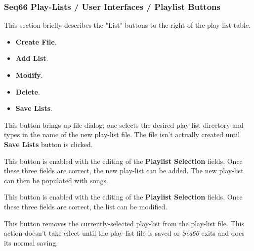 \subsubsection{Seq66 Play-Lists / User Interfaces / Playlist Buttons}
\label{subsubsec:playlist_ui_playlist_buttons}

   This section briefly describes the "List" buttons to the right of the
   play-list table.

   \begin{itemize}
      \item \textbf{Create File}.
      \item \textbf{Add List}.
      \item \textbf{Modify}.
      \item \textbf{Delete}.
      \item \textbf{Save Lists}.
   \end{itemize}

   \setcounter{ItemCounter}{0}      %


   This button brings up file dialog; one selects the desired play-list
   directory and types in the name of the new play-list file.
   The file isn't actually created until \textbf{Save Lists} button is
   clicked.

   This button is enabled with the editing of the \textbf{Playlist Selection}
   fields.  Once these three fields are correct, the new play-list can be added.
   The new play-list can then be populated with songs.

   This button is enabled with the editing of the \textbf{Playlist Selection}
   fields.  Once these three fields are correct, the list can be modified.

   This button removes the currently-selected play-list from the play-list
   file.  This action doesn't take effect until the play-list file is saved or
   \textsl{Seq66} exits and does its normal saving.

